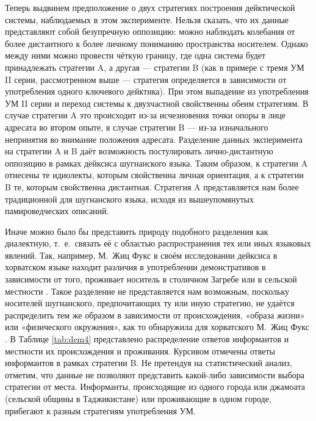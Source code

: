 Теперь выдвинем предположение о двух стратегиях построения дейктической системы, наблюдаемых в этом эксперименте. Нельзя сказать, что их данные представляют собой безупречную оппозицию: можно наблюдать колебания от более дистантного к более личному пониманию пространства носителем. Однако между ними можно провести чёткую границу, где одна система будет принадлежать стратегии A, а другая — стратегии B (как в примере с тремя УМ II серии, рассмотренном выше — стратегия определяется в зависимости от употребления одного ключевого дейктика). При этом выпадение из употребления УМ II серии и переход системы к двухчастной свойственны обеим стратегиям. В случае стратегии A это происходит из-за исчезновения точки опоры в лице адресата во втором опыте, в случае стратегии B — из-за изначального непринятия во внимание положения адресата. Разделение данных эксперимента на стратегии A и B даёт возможность постулировать лично-дистантную оппозицию в рамках дейксиса шугнанского языка. Таким образом, к стратегии A отнесены те идиолекты, которым свойственна личная ориентация, а к стратегии B те, которым свойственна дистантная. Стратегия A представляется нам более традиционной для шугнанского языка, исходя из вышеупомянутых памироведческих описаний.

Иначе можно было бы представить природу подобного разделения как диалектную, т.~е.~связать её с областью распространения тех или иных языковых явлений. Так, например, М.~Жиц Фукс в своём исследовании дейксиса в хорватском языке находит различия в употреблении демонстративов в зависимости от того, проживает носитель в столичном Загребе или в сельской местности \parencite[55]{zic_fuchs1996}. Такое разделение не представляется нам возможным, поскольку носителей шугнанского, предпочитающих ту или иную стратегию, не удаётся распределить тем же образом в зависимости от происхождения, «образа жизни» или «физического окружения», как то обнаружила для хорватского М.~Жиц Фукс \parencite[60]{zic_fuchs1996}. В Таблице \ref{tab:dem4} представлено распределение ответов информантов и местности их происхождения и проживания. Курсивом отмечены ответы информантов в рамках стратегии B. Не претендуя на статистический анализ, отметим, что данные не позволяют представить какой-либо зависимости выбора стратегии от места. Информанты, происходящие из одного города или джамоата (сельской общины в Таджикистане) или проживающие в одном городе, прибегают к разным стратегиям употребления УМ.

